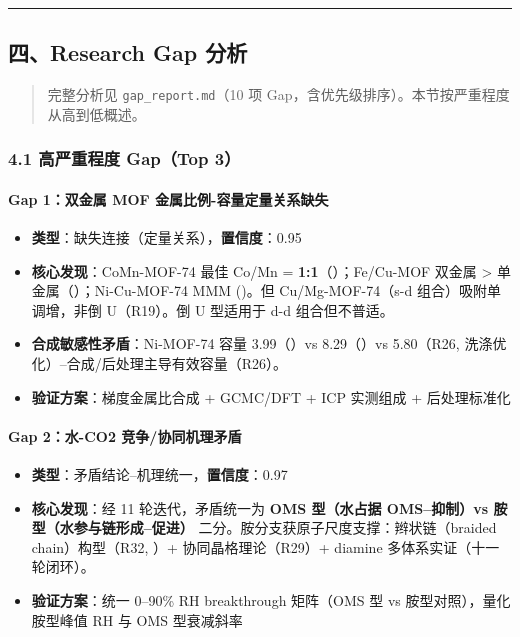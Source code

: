 \documentclass[12pt,a4paper]{ctexart}
\providecommand{\tightlist}{%
  \setlength{\itemsep}{0pt}\setlength{\parskip}{0pt}}
\begin{document}
\begin{center}\rule{0.5\linewidth}{0.5pt}\end{center}

\subsection{四、Research Gap 分析}\label{ux56dbresearch-gap-ux5206ux6790}

\begin{quote}
完整分析见 \texttt{gap\_report.md}（10 项 Gap，含优先级排序）。本节按严重程度从高到低概述。
\end{quote}

\subsubsection{4.1 高严重程度 Gap（Top 3）}\label{ux9ad8ux4e25ux91cdux7a0bux5ea6-gaptop-3}

\paragraph{Gap 1：双金属 MOF 金属比例-容量定量关系缺失}\label{gap-1ux53ccux91d1ux5c5e-mof-ux91d1ux5c5eux6bd4ux4f8b-ux5bb9ux91cfux5b9aux91cfux5173ux7cfbux7f3aux5931}

\begin{itemize}
\tightlist
\item
  \textbf{类型}：缺失连接（定量关系），\textbf{置信度}：0.95
\item
  \textbf{核心发现}：CoMn-MOF-74 最佳 Co/Mn = \textbf{1:1}（\cite{p65}）；Fe/Cu-MOF 双金属 \textgreater{} 单金属（\cite{p67}）；Ni-Cu-MOF-74 MMM (\cite{p22})。但 Cu/Mg-MOF-74（s-d 组合）吸附单调增，非倒 U（R19）。倒 U 型适用于 d-d 组合但不普适。
\item
  \textbf{合成敏感性矛盾}：Ni-MOF-74 容量 3.99（\cite{p62}）vs 8.29（\cite{p20}）vs 5.80（R26, 洗涤优化）--合成/后处理主导有效容量（R26）。
\item
  \textbf{验证方案}：梯度金属比合成 + GCMC/DFT + ICP 实测组成 + 后处理标准化
\end{itemize}

\paragraph{Gap 2：水-CO2 竞争/协同机理矛盾}\label{gap-2ux6c34-co2-ux7adeux4e89ux534fux540cux673aux7406ux77dbux76fe}

\begin{itemize}
\tightlist
\item
  \textbf{类型}：矛盾结论--机理统一，\textbf{置信度}：0.97
\item
  \textbf{核心发现}：经 11 轮迭代，矛盾统一为 \textbf{OMS 型（水占据 OMS--抑制）vs 胺型（水参与链形成--促进）} 二分。胺分支获原子尺度支撑：辫状链（braided chain）构型（R32, \cite{r11s2_1fdf67d949bc}）+ 协同晶格理论（R29）+ diamine 多体系实证（十一轮闭环）。
\item
  \textbf{验证方案}：统一 0--90\% RH breakthrough 矩阵（OMS 型 vs 胺型对照），量化胺型峰值 RH 与 OMS 型衰减斜率
\end{itemize}
\end{document}
